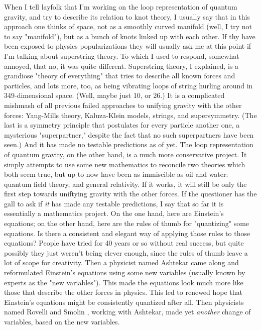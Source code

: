 When I tell layfolk that I'm working on the loop representation of
quantum gravity, and try to describe its relation to knot theory, I
usually say that in this approach one thinks of space, not as a
smoothly curved manifold (well, I try not to say "manifold"), but as a
bunch of knots linked up with each other.  If thy have been exposed to
physics popularizations they will usually ask me at this point if I'm
talking about superstring theory.  To which I used to respond, somewhat
annoyed, that no, it was quite different.   Superstring theory, I
explained, is a grandiose "theory of everything" that tries to describe
all known forces and particles, and lots more, too, as being vibrating
loops of string hurling around in 349-dimensional space.  (Well, maybe
just 10, or 26.)  It is a complicated mishmash of all previous failed
approaches to unifying gravity with the other forces: Yang-Mills theory,
Kaluza-Klein models, strings, and supersymmetry.  (The last is a
symmetry principle that postulates for every particle another one, a
mysterious "superpartner," despite the fact that no such superpartners
have been seen.)  And it has made no testable predictions as of yet.
The loop representation of quantum gravity, on the other hand, is a much
more conservative project.  It simply attempts to use some new
mathematics to reconcile two theories which both seem true, but up to
now have been as immiscible as oil and water: quantum field theory, and
general relativity.  If it works, it will still be only the first step
towards uniftying gravity with the other forces.  If the questioner has
the gall to ask if \emph{it} has made any testable predictions, I say that so
far it is essentially a mathematics project.  On the one hand, here are
Einstein's equations; on the other hand, here are the rules of thumb for
"quantizing" some equations.  Is there a consistent and elegant way of
applying those rules to those equations?   People have tried for 40
years or so without real success, but quite possibly they just weren't
being clever enough, since the rules of thumb leave a lot of scope for
creativity.  Then a physicist named Ashtekar came along and reformulated
Einstein's equations using some new variables (usually known by experts
as the "new variables").  This made the equations look much more like
those that describe the other forces in physics.  This led to renewed
hope that Einstein's equations might be consistently quantized after
all.  Then physicists named Rovelli and Smolin , working with Ashtekar,
made yet \emph{another} change of variables, based on the new variables.
